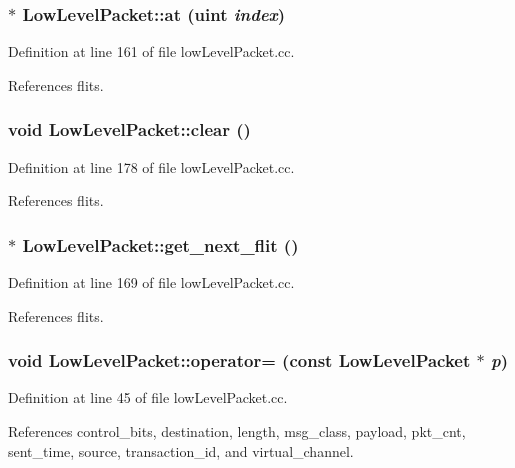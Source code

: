 \subsubsection[{at}]{ $\ast$ LowLevelPacket::at ({\bf uint} {\em index})}\label{classLowLevelPacket_01bcea53e1afb4be73ddaa8503e053dc}




Definition at line 161 of file lowLevelPacket.cc.

References flits.
\subsubsection[{clear}]{\setlength{\rightskip}{0pt plus 5cm}void LowLevelPacket::clear ()}\label{classLowLevelPacket_726a1d04c62dc4f20de1bcd7bebd031d}




Definition at line 178 of file lowLevelPacket.cc.

References flits.
\subsubsection[{get\_\-next\_\-flit}]{ $\ast$ LowLevelPacket::get\_\-next\_\-flit ()}\label{classLowLevelPacket_508b439358881368b5ef646ef36b4cac}




Definition at line 169 of file lowLevelPacket.cc.

References flits.
\subsubsection[{operator=}]{\setlength{\rightskip}{0pt plus 5cm}void LowLevelPacket::operator= (const {\bf LowLevelPacket} $\ast$ {\em p})}\label{classLowLevelPacket_5a52c8b9499a757227a71ba51f1ef61a}




Definition at line 45 of file lowLevelPacket.cc.

References control\_\-bits, destination, length, msg\_\-class, payload, pkt\_\-cnt, sent\_\-time, source, transaction\_\-id, and virtual\_\-channel.

